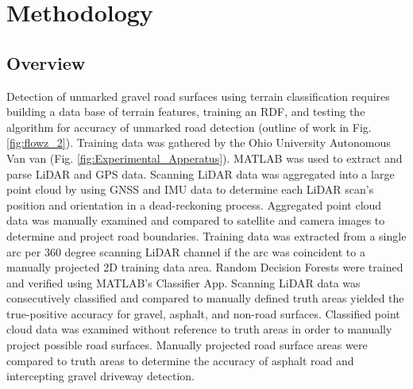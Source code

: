 \documentclass[journal,onecolumn]{IEEEtran}
\begin{document}
	
	
	
	
	
	\section{Methodology}
	
		\subsection{Overview}
	
			{Detection of unmarked gravel road surfaces using terrain classification requires building a data base of terrain features, training an RDF, and testing the algorithm for accuracy of unmarked road detection (outline of work in Fig. \ref{fig:flowz_2}). Training data was gathered by the Ohio University Autonomous Van van (Fig. \ref{fig:Experimental_Apperatus}). MATLAB was used to extract and parse LiDAR and GPS data. Scanning LiDAR data was aggregated into a large point cloud by using GNSS and IMU data to determine each LiDAR scan's position and orientation in a dead-reckoning process. Aggregated point cloud data was manually examined and compared to satellite and camera images to determine and project road boundaries. Training data was extracted from a single arc per 360 degree scanning LiDAR channel if the arc was coincident to a manually projected 2D training data area. Random Decision Forests were trained and verified using MATLAB's Classifier App. Scanning LiDAR data was consecutively classified and compared to manually defined truth areas yielded the true-positive accuracy for gravel, asphalt, and non-road surfaces. Classified point cloud data was examined without reference to truth areas in order to manually project possible road surfaces. Manually projected road surface areas were compared to truth areas to determine the accuracy of asphalt road and intercepting gravel driveway detection.}
			
\end{document}
